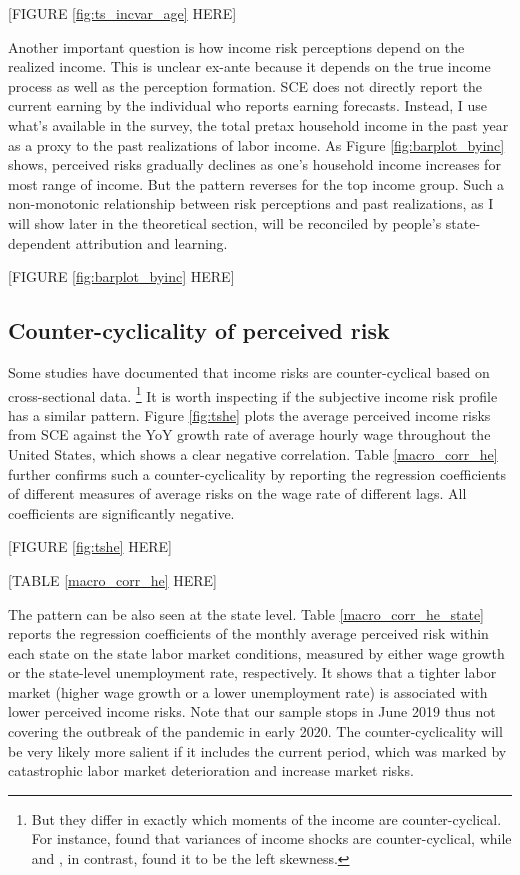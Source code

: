 \documentclass[12pt,notitlepage,onecolumn,aps,pra]{article}
\begin{document}
{[}FIGURE \ref{fig:ts_incvar_age} HERE{]}

Another important question is how income risk perceptions depend on the
realized income. This is unclear ex-ante because it depends on the true
income process as well as the perception formation. SCE does not
directly report the current earning by the individual who reports
earning forecasts. Instead, I use what's available in the survey, the
total pretax household income in the past year as a proxy to the past
realizations of labor income. As Figure \ref{fig:barplot_byinc} shows,
perceived risks gradually declines as one's household income increases
for most range of income. But the pattern reverses for the top income
group. Such a non-monotonic relationship between risk perceptions and
past realizations, as I will show later in the theoretical section, will
be reconciled by people's state-dependent attribution and learning.

{[}FIGURE \ref{fig:barplot_byinc} HERE{]}




    \hypertarget{counter-cyclicality-of-perceived-risk}{%
\subsection{Counter-cyclicality of perceived
risk}\label{counter-cyclicality-of-perceived-risk}}

Some studies have documented that income risks are counter-cyclical
based on cross-sectional data.
\footnote{But they differ in exactly which moments of the income are counter-cyclical. For instance, \cite{storesletten2004cyclical} found that variances of income shocks are counter-cyclical, while \cite{guvenen2014nature} and \cite{catherine_countercyclical_2019}, in contrast, found it to be the left skewness.}
It is worth inspecting if the subjective income risk profile has a
similar pattern. Figure \ref{fig:tshe} plots the average perceived
income risks from SCE against the YoY growth rate of average hourly wage
throughout the United States, which shows a clear negative correlation.
Table \ref{macro_corr_he} further confirms such a counter-cyclicality by
reporting the regression coefficients of different measures of average
risks on the wage rate of different lags. All coefficients are
significantly negative.

{[}FIGURE \ref{fig:tshe} HERE{]}

{[}TABLE \ref{macro_corr_he} HERE{]}

The pattern can be also seen at the state level. Table
\ref{macro_corr_he_state} reports the regression coefficients of the
monthly average perceived risk within each state on the state labor
market conditions, measured by either wage growth or the state-level
unemployment rate, respectively. It shows that a tighter labor market
(higher wage growth or a lower unemployment rate) is associated with
lower perceived income risks. Note that our sample stops in June 2019
thus not covering the outbreak of the pandemic in early 2020. The
counter-cyclicality will be very likely more salient if it includes the
current period, which was marked by catastrophic labor market
deterioration and increase market risks.
\end{document}
